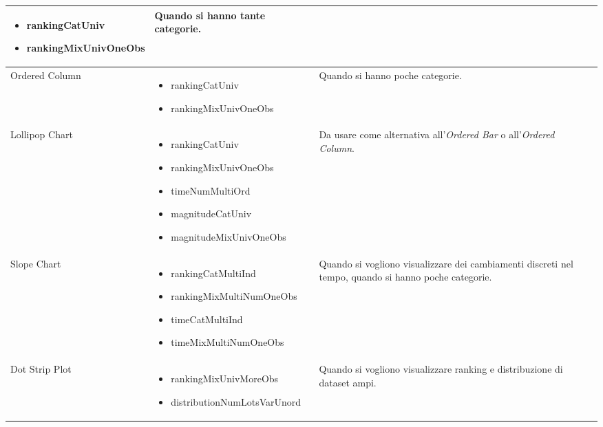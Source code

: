\begin{xltabular}{\columnwidth}{|p{0.15\columnwidth}|X|p{0.27\columnwidth}|}
\begin{itemize}[noitemsep,topsep=0pt, left=0pt]
        \item rankingCatUniv
        \item rankingMixUnivOneObs
    \end{itemize} & 
    Quando si hanno tante categorie. \\
    \hline
    Ordered Column & 
    \vspace{-3.5mm}
    \begin{itemize}[noitemsep,topsep=0pt, left=0pt]
        \item rankingCatUniv
        \item rankingMixUnivOneObs
    \end{itemize} & 
    Quando si hanno poche categorie. \\
    \hline
    Lollipop Chart & 
    \vspace{-3.5mm}
    \begin{itemize}[noitemsep,topsep=0pt, left=0pt]
        \item rankingCatUniv
        \item rankingMixUnivOneObs
        \item timeNumMultiOrd
        \item magnitudeCatUniv
        \item magnitudeMixUnivOneObs
    \end{itemize} & 
    Da usare come alternativa all'\emph{Ordered Bar} o all'\emph{Ordered Column}. \\
    \hline
    Slope Chart & 
    \vspace{-3.5mm}
    \begin{itemize}[noitemsep,topsep=0pt, left=0pt]
        \item rankingCatMultiInd
        \item rankingMixMultiNumOneObs
        \item timeCatMultiInd
        \item timeMixMultiNumOneObs
    \end{itemize} & 
    Quando si vogliono visualizzare dei cambiamenti discreti nel tempo, quando si hanno poche categorie. \\
    \hline
    Dot Strip Plot & 
    \vspace{-3.5mm}
    \begin{itemize}[noitemsep,topsep=0pt, left=0pt]
        \item rankingMixUnivMoreObs
        \item distributionNumLotsVarUnord
    \end{itemize} & 
    Quando si vogliono visualizzare ranking e distribuzione di dataset ampi. \\

\end{xltabular}
